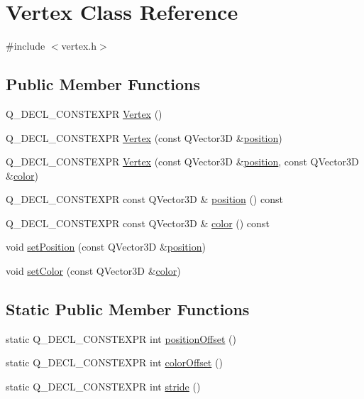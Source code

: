 \hypertarget{class_vertex}{}\section{Vertex Class Reference}
\label{class_vertex}


{\ttfamily \#include $<$vertex.\+h$>$}

\subsection*{Public Member Functions}
\begin{DoxyCompactItemize}
\item 
Q\+\_\+\+D\+E\+C\+L\+\_\+\+C\+O\+N\+S\+T\+E\+X\+P\+R \hyperlink{class_vertex_a647e2b0c42fdfd04fadebae37ed94e3e}{Vertex} ()
\item 
Q\+\_\+\+D\+E\+C\+L\+\_\+\+C\+O\+N\+S\+T\+E\+X\+P\+R \hyperlink{class_vertex_abd9662d85a8594ea74d2b349286498da}{Vertex} (const Q\+Vector3\+D \&\hyperlink{class_vertex_a5cc133b4fcf419eab539b95b4e713d42}{position})
\item 
Q\+\_\+\+D\+E\+C\+L\+\_\+\+C\+O\+N\+S\+T\+E\+X\+P\+R \hyperlink{class_vertex_a6ed0ae9e821c3cdcf4ae7700872c913e}{Vertex} (const Q\+Vector3\+D \&\hyperlink{class_vertex_a5cc133b4fcf419eab539b95b4e713d42}{position}, const Q\+Vector3\+D \&\hyperlink{class_vertex_aa482d7c9ff336901c987723b9e0ec4b5}{color})
\item 
Q\+\_\+\+D\+E\+C\+L\+\_\+\+C\+O\+N\+S\+T\+E\+X\+P\+R const Q\+Vector3\+D \& \hyperlink{class_vertex_a5cc133b4fcf419eab539b95b4e713d42}{position} () const 
\item 
Q\+\_\+\+D\+E\+C\+L\+\_\+\+C\+O\+N\+S\+T\+E\+X\+P\+R const Q\+Vector3\+D \& \hyperlink{class_vertex_aa482d7c9ff336901c987723b9e0ec4b5}{color} () const 
\item 
void \hyperlink{class_vertex_a8da242585395d719b1bd1163895bd80d}{set\+Position} (const Q\+Vector3\+D \&\hyperlink{class_vertex_a5cc133b4fcf419eab539b95b4e713d42}{position})
\item 
void \hyperlink{class_vertex_ae8a764bdc15d2fa9a2ccc766281651b1}{set\+Color} (const Q\+Vector3\+D \&\hyperlink{class_vertex_aa482d7c9ff336901c987723b9e0ec4b5}{color})
\end{DoxyCompactItemize}
\subsection*{Static Public Member Functions}
\begin{DoxyCompactItemize}
\item 
static Q\+\_\+\+D\+E\+C\+L\+\_\+\+C\+O\+N\+S\+T\+E\+X\+P\+R int \hyperlink{class_vertex_af1fbdec4ee8d94820f060576c804cc08}{position\+Offset} ()
\item 
static Q\+\_\+\+D\+E\+C\+L\+\_\+\+C\+O\+N\+S\+T\+E\+X\+P\+R int \hyperlink{class_vertex_acdbc97e99155c9c5b9cd3a6391544f9c}{color\+Offset} ()
\item 
static Q\+\_\+\+D\+E\+C\+L\+\_\+\+C\+O\+N\+S\+T\+E\+X\+P\+R int \hyperlink{class_vertex_a966a81701eacd6bad774bdf3b39bb895}{stride} ()
\end{DoxyCompactItemize}
